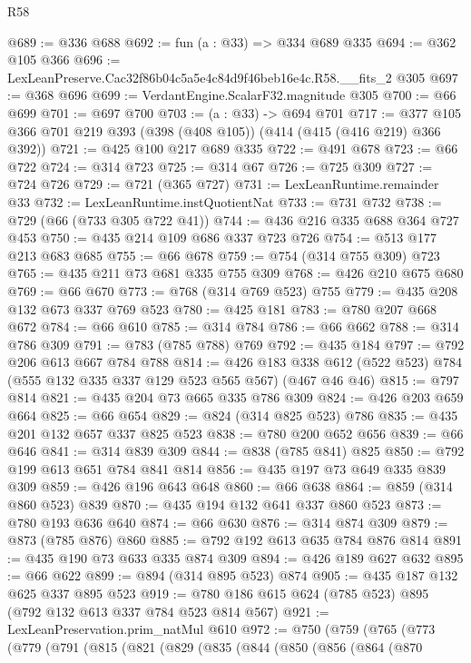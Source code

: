 \begin{lexlean}{R58}
\begin{coremodule}
@689 := @336 @688
@692 := fun (a : @33) => @334 @689 @335
@694 := @362 @105 @366
@696 := LexLeanPreserve.Cac32f86b04c5a5e4c84d9f46beb16e4c.R58.__fits_2 @305
@697 := @368 @696
@699 := VerdantEngine.ScalarF32.magnitude @305
@700 := @66 @699
@701 := @697 @700
@703 := (a : @33) -> @694 @701
@717 := @377 @105 @366 @701 @219 @393 (@398 (@408 @105)) (@414 (@415 (@416 @219) @366 @392))
@721 := @425 @100 @217 @689 @335
@722 := @491 @678
@723 := @66 @722
@724 := @314 @723
@725 := @314 @67
@726 := @725 @309
@727 := @724 @726
@729 := @721 (@365 @727)
@731 := LexLeanRuntime.remainder @33
@732 := LexLeanRuntime.instQuotientNat
@733 := @731 @732
@738 := @729 (@66 (@733 @305 @722 @41))
@744 := @436 @216 @335 @688 @364 @727 @453
@750 := @435 @214 @109 @686 @337 @723 @726
@754 := @513 @177 @213 @683 @685
@755 := @66 @678
@759 := @754 (@314 @755 @309) @723
@765 := @435 @211 @73 @681 @335 @755 @309
@768 := @426 @210 @675 @680
@769 := @66 @670
@773 := @768 (@314 @769 @523) @755
@779 := @435 @208 @132 @673 @337 @769 @523
@780 := @425 @181
@783 := @780 @207 @668 @672
@784 := @66 @610
@785 := @314 @784
@786 := @66 @662
@788 := @314 @786 @309
@791 := @783 (@785 @788) @769
@792 := @435 @184
@797 := @792 @206 @613 @667 @784 @788
@814 := @426
    @183
    @338
    @612
    (@522 @523)
    @784
    (@555 @132 @335 @337 @129 @523 @565 @567)
    (@467 @46 @46)
@815 := @797 @814
@821 := @435 @204 @73 @665 @335 @786 @309
@824 := @426 @203 @659 @664
@825 := @66 @654
@829 := @824 (@314 @825 @523) @786
@835 := @435 @201 @132 @657 @337 @825 @523
@838 := @780 @200 @652 @656
@839 := @66 @646
@841 := @314 @839 @309
@844 := @838 (@785 @841) @825
@850 := @792 @199 @613 @651 @784 @841 @814
@856 := @435 @197 @73 @649 @335 @839 @309
@859 := @426 @196 @643 @648
@860 := @66 @638
@864 := @859 (@314 @860 @523) @839
@870 := @435 @194 @132 @641 @337 @860 @523
@873 := @780 @193 @636 @640
@874 := @66 @630
@876 := @314 @874 @309
@879 := @873 (@785 @876) @860
@885 := @792 @192 @613 @635 @784 @876 @814
@891 := @435 @190 @73 @633 @335 @874 @309
@894 := @426 @189 @627 @632
@895 := @66 @622
@899 := @894 (@314 @895 @523) @874
@905 := @435 @187 @132 @625 @337 @895 @523
@919 := @780 @186 @615 @624 (@785 @523) @895 (@792 @132 @613 @337 @784 @523 @814 @567)
@921 := LexLeanPreservation.prim_natMul @610
@972 := @750
    (@759
      (@765
        (@773
          (@779
            (@791
              (@815
                (@821
                  (@829
                    (@835
                      (@844
                        (@850
                          (@856
                            (@864
                              (@870

\end{coremodule}
\end{lexlean}
